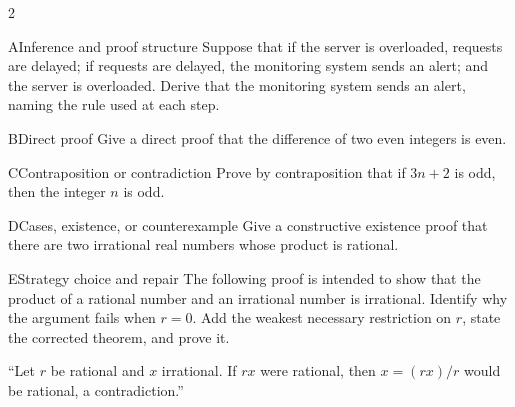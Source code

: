 \documentclass[9pt]{extarticle}
\begin{document}
\CoreWorkArea
\FormBreak
{}
\begin{multicols}{2}
\begin{CoreProblem}{A}{Inference and proof structure}
Suppose that if the server is overloaded, requests are delayed; if requests are
delayed, the monitoring system sends an alert; and the server is overloaded.
Derive that the monitoring system sends an alert, naming the rule used at each
step.
\end{CoreProblem}
\begin{CoreProblem}{B}{Direct proof}
Give a direct proof that the difference of two even integers is even.
\end{CoreProblem}
\begin{CoreProblem}{C}{Contraposition or contradiction}
Prove by contraposition that if $3n+2$ is odd, then the integer $n$ is odd.
\end{CoreProblem}
\columnbreak
\begin{CoreProblem}{D}{Cases, existence, or counterexample}
Give a constructive existence proof that there are two irrational real numbers
whose product is rational.
\end{CoreProblem}
\begin{CoreProblem}{E}{Strategy choice and repair}
The following proof is intended to show that the product of a rational number
and an irrational number is irrational. Identify why the argument fails when
$r=0$. Add the weakest necessary restriction on $r$, state the corrected
theorem, and prove it.

``Let $r$ be rational and $x$ irrational. If $rx$ were rational, then $x=(rx)/r$ would be rational, a contradiction.''
\end{CoreProblem}
\end{multicols}
\CoreWorkArea
\FormBreak
{}
\end{document}
